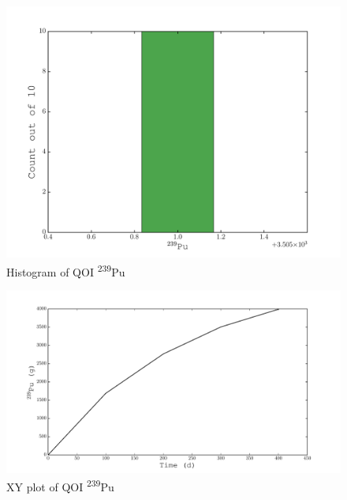 \documentclass[11pt,notitlepage]{article}
\newcommand{\tss}{\textsuperscript}
\begin{document}
  \begin{figure}[H]
    \begin{center}
      \includegraphics[width=0.77\columnwidth]{../Origen2/PLOTS/PU239Post_HIST.pdf}
      \vspace{-5mm}
      \caption{Histogram of QOI \tss{239}Pu}
      \label{fig:POSTHISTPu239}
    \end{center}
  \end{figure}

    \begin{figure}[H]
    \begin{center}
      \includegraphics[width=0.77\columnwidth]{../Origen2/PLOTS/PU239Post_XY.pdf}
      \vspace{-5mm}
      \caption{XY plot of QOI \tss{239}Pu}
      \label{fig:POSTXYPu239}
    \end{center}
  \end{figure}
\end{document}

